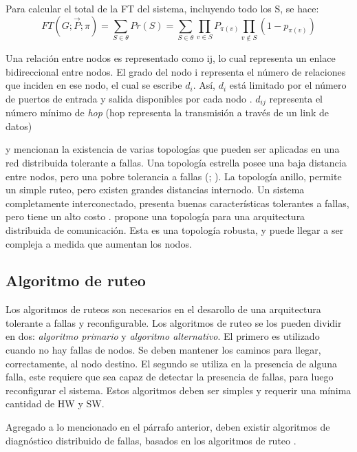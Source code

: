 Para calcular el total de la \ac{FT} del sistema, incluyendo todo los S, se hace: $$FT(G;\vec{P};\pi) = \sum_{S \in \theta}{Pr(S)} = \sum_{S \in \theta}{\prod_{v\in S}{P_{\pi (v)}} \prod_{v \notin S} (1-p_{\pi (v)})}$$

Una relación entre nodos es representado  como ij, lo cual representa un enlace bidireccional entre nodos. El grado del nodo i representa el número de relaciones que inciden en ese nodo, el cual se escribe $d_i$. Así, $d_i$ está limitado por el número de puertos de entrada y salida disponibles por cada nodo \citep{Pradhan82}. $d_{ij}$ representa el número mínimo de \textit{hop} (hop representa la transmisión a través de un link de datos) \citep{Pradhan82}

\cite{Stivaros92} y \cite{Pradhan82} mencionan la existencia de varias topologías que pueden ser aplicadas en una red distribuida tolerante a fallas. Una topología estrella posee una baja distancia entre nodos, pero una pobre tolerancia a fallas (\citep{Pradhan82}; \citep{Stivaros92}). La topología anillo, permite un simple ruteo, pero existen grandes distancias internodo. Un sistema completamente interconectado, presenta buenas características tolerantes a fallas, pero tiene un alto costo \citep{Pradhan82}. \cite{Pradhan82} propone una topología para una arquitectura distribuida de comunicación. Esta es una topología robusta, y puede llegar a ser compleja a medida que aumentan los nodos.

\subsection{Algoritmo de ruteo}
Los algoritmos de ruteos son necesarios en el desarollo de una arquitectura tolerante a fallas y reconfigurable. Los algoritmos de ruteo se los pueden dividir en dos: \textit{algoritmo primario} y \textit{algoritmo alternativo}. El primero es utilizado cuando no hay fallas de nodos. Se deben mantener los caminos para llegar, correctamente, al nodo destino. El segundo se utiliza en la presencia de alguna falla, este requiere que sea capaz de detectar la presencia de fallas, para luego reconfigurar el sistema. Estos algoritmos deben ser simples y requerir una mínima cantidad de \ac{HW} y \ac{SW}.

Agregado a lo mencionado en el párrafo anterior, deben existir algoritmos de diagnóstico distribuido de fallas, basados en los algoritmos de ruteo \citep{Pradhan82}.
